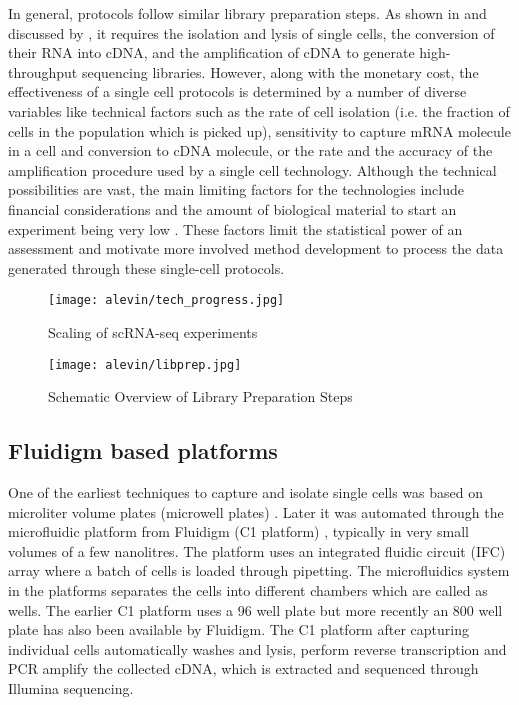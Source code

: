 In general, \singlecell protocols follow similar library preparation steps. As shown in  and discussed by \citep{ziegenhain2017comparative}, it requires the isolation and lysis of single cells, the conversion of their RNA into cDNA, and the amplification of cDNA to generate high-throughput sequencing libraries. However, along with the monetary cost, the effectiveness of a single cell protocols is determined by a number of diverse variables like technical factors such as the rate of cell isolation (i.e. the fraction of cells in the population which is picked up), sensitivity to capture mRNA molecule in a cell and conversion to cDNA molecule, or the rate and the accuracy of the amplification procedure used by a single cell technology. Although the technical possibilities are vast, the main limiting factors for the \singlecell technologies include financial considerations and the amount of biological material to start an experiment being very low \citep{vieth2017powsimr, ziegenhain2017comparative}. These factors limit the statistical power of an assessment and motivate more involved method development to process the data generated through these single-cell protocols.



\begin{figure*}
 \centering
 \texttt{[image: alevin/tech\_progress.jpg]}
  \caption{Scaling of scRNA-seq experiments \citep{svensson2018exponential}}
  \label{fig:sc-techs}
\end{figure*}

\begin{figure*}
 \centering
 \texttt{[image: alevin/libprep.jpg]}
  \caption{Schematic Overview of Library Preparation Steps \citep{ziegenhain2017comparative}}
  \label{fig:libprep}
\end{figure*}

\subsection{Fluidigm based platforms ~\citep{islam2012highly, hashimshony2012cel}}
\label{intro:fluidigm}

One of the earliest techniques to capture and isolate single cells was based on microliter volume plates (microwell plates) \citep{islam2012highly, hashimshony2012cel}. Later it was automated through the microfluidic platform from Fluidigm (C1 platform) \citep{islam2014}, typically in very small volumes of a few nanolitres. The platform uses an integrated fluidic circuit (IFC) array where a batch of cells is loaded through pipetting. The microfluidics system in the platforms separates the cells into different chambers which are called as wells. The earlier C1 platform uses a 96 well plate but more recently an 800 well plate has also been available by Fluidigm. The C1 platform after capturing individual cells automatically washes and lysis, perform reverse transcription and PCR amplify the collected cDNA, which is extracted and sequenced through Illumina sequencing.

